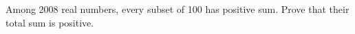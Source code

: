 Among 2008 real numbers, every subset of 100 has positive sum. Prove that their total sum is positive.
